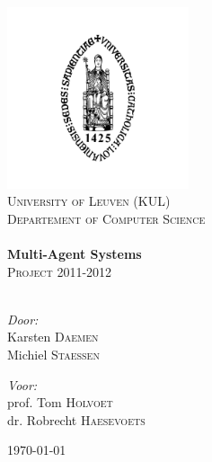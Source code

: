 \begin{titlepage}

\begin{center}


\includegraphics[width=0.40\textwidth]{./logo}\\[1cm]    

\textsc{\LARGE University of Leuven (KUL)}\\[0.3cm]

\textsc{\Large Departement of Computer Science}\\[2.0cm]


\HRule \\[0.4cm]
{ \huge \bfseries Multi-Agent Systems}\\[0.2cm]
\textsc{ \Large Project 2011-2012}\\[0.4cm]
\HRule \\[2.5cm]

\begin{minipage}{0.4\textwidth}
\begin{flushleft} \large
\emph{Door:}\\
Karsten \textsc{Daemen}\\
Michiel \textsc{Staessen}

\end{flushleft}
\end{minipage}
\begin{minipage}{0.5\textwidth}
\begin{flushright} \large
\emph{Voor:} \\
prof. Tom \textsc{Holvoet} \\
dr. Robrecht \textsc{Haesevoets}
\end{flushright}
\end{minipage}

\vfill

{\large \today}

\end{center}

\end{titlepage}